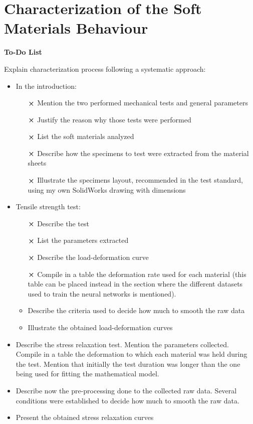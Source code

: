 \chapter{Characterization of the Soft Materials Behaviour} \label{ch:characterizationSoft}

\textbf{ \huge To-Do List}

Explain characterization process following a systematic approach:
\begin{itemize}
    \item In the introduction:
    \begin{itemize}
        \item[$\cross$] Mention the two performed mechanical tests and general parameters
        \item[$\cross$] Justify the reason why those tests were performed
        \item[$\cross$] List the soft materials analyzed
        \item[$\cross$] Describe how the specimens to test were extracted from the material sheets
        \item[$\cross$] Illustrate the specimens layout, recommended in the test standard, using my own SolidWorks drawing with dimensions
    \end{itemize}
    \item Tensile strength test:
    \begin{itemize}
        \item[$\cross$] Describe the test
        \item[$\cross$] List the parameters extracted
        \item[$\cross$] Describe the load-deformation curve
        \item[$\cross$] Compile in a table the deformation rate used for each material (this table can be placed instead in the section where the different datasets used to train the neural networks is mentioned).
        \item Describe the criteria used to decide how much to smooth the raw data
        \item Illustrate the obtained load-deformation curves
    \end{itemize} 
    \item Describe the stress relaxation test. Mention the parameters collected. Compile in a table the deformation to which each material was held during the test. Mention that initially the test duration was longer than the one being used for fitting the mathematical model.
    \item Describe now the pre-processing done to the collected raw data. Several conditions were established to decide how much to smooth the raw data.
    \item Present the obtained stress relaxation curves
\end{itemize}


